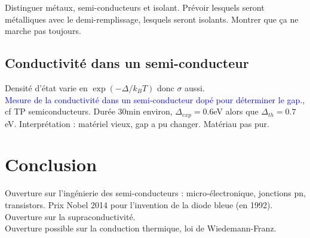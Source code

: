 Distinguer métaux, semi-conducteurs et isolant. Prévoir lesquels seront métalliques avec le demi-remplissage, lesquels seront isolants. Montrer que ça ne marche pas toujours.
\subsection{Conductivité dans un semi-conducteur}
Densité d'état varie en $\exp(-\Delta/k_BT)$ donc $\sigma$ aussi.\\

\textcolor{blue}{Mesure de la conductivité dans un semi-conducteur dopé pour déterminer le gap.}, cf TP semiconducteurs. Durée 30min environ, $\Delta_{exp}=0.6$eV alors que $\Delta_{th}=0.7$eV. Interprétation : matériel vieux, gap a pu changer. Matériau pas pur.\\
\section{Conclusion}
Ouverture sur l'ingénierie des semi-conducteurs : micro-électronique, jonctions pn, transistors. Prix Nobel 2014 pour l'invention de la diode bleue (en 1992).\\
Ouverture sur la supraconductivité.\\
Ouverture possible sur la conduction thermique, loi de Wiedemann-Franz.